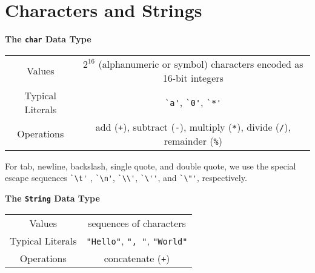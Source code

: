 \documentclass[8pt,a4paper,compress]{beamer}
\begin{document}
\section{Characters and Strings}
\begin{frame}[fragile]
\pause

\textbf{The \lstinline$char$ Data Type}

\begin{center}
\begin{tabular}{c|c}
Values & $2^{16}$ (alphanumeric or symbol) characters encoded as 16-bit integers \\ 
Typical Literals & \lstinline$`a'$, \lstinline$`0'$, \lstinline$`*'$ \\ 
Operations & add (\lstinline$+$), subtract (\lstinline$-$), multiply (\lstinline$*$), divide (\lstinline$/$), remainder (\lstinline$%$) \\ 
\end{tabular} 
\end{center}

For tab, newline, backslash, single quote, and double quote, we use the special escape sequences \lstinline$`\t'$ , \lstinline$`\n'$, \lstinline$`\\'$, \lstinline$`\''$, and \lstinline$`\"'$, respectively. 

\pause
\smallskip

\textbf{The \lstinline$String$ Data Type}

\begin{center}
\begin{tabular}{c|c}
Values & sequences of characters \\ 
Typical Literals & \lstinline$"Hello"$, \lstinline$", "$, \lstinline$"World"$ \\ 
Operations & concatenate (\lstinline$+$) \\ 
\end{tabular} 
\end{center}
\end{frame}
\end{document}

